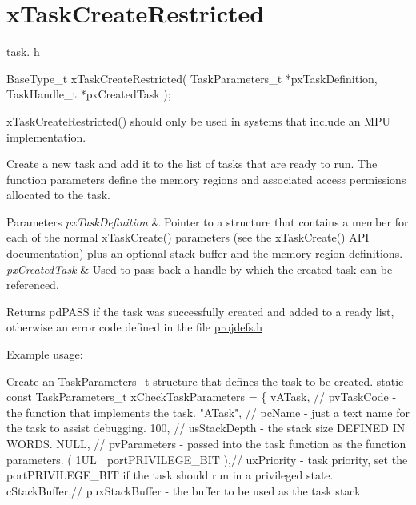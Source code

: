 \hypertarget{group__xTaskCreateRestricted}{\section{x\-Task\-Create\-Restricted}
\label{group__xTaskCreateRestricted}
}
task. h 
\begin{DoxyPre}
 BaseType\_t xTaskCreateRestricted( TaskParameters\_t *pxTaskDefinition, TaskHandle\_t *pxCreatedTask );\end{DoxyPre}


x\-Task\-Create\-Restricted() should only be used in systems that include an M\-P\-U implementation.

Create a new task and add it to the list of tasks that are ready to run. The function parameters define the memory regions and associated access permissions allocated to the task.


\begin{DoxyParams}{Parameters}
{\em px\-Task\-Definition} & Pointer to a structure that contains a member for each of the normal x\-Task\-Create() parameters (see the x\-Task\-Create() A\-P\-I documentation) plus an optional stack buffer and the memory region definitions.\\
\hline
{\em px\-Created\-Task} & Used to pass back a handle by which the created task can be referenced.\\
\hline
\end{DoxyParams}
\begin{DoxyReturn}{Returns}
pd\-P\-A\-S\-S if the task was successfully created and added to a ready list, otherwise an error code defined in the file \hyperlink{projdefs_8h}{projdefs.\-h}
\end{DoxyReturn}
Example usage\-: 
\begin{DoxyPre}
Create an TaskParameters\_t structure that defines the task to be created.
static const TaskParameters\_t xCheckTaskParameters =
\{
    vATask,     // pvTaskCode - the function that implements the task.
    "ATask",    // pcName - just a text name for the task to assist debugging.
    100,        // usStackDepth - the stack size DEFINED IN WORDS.
    NULL,       // pvParameters - passed into the task function as the function parameters.
    ( 1UL | portPRIVILEGE\_BIT ),// uxPriority - task priority, set the portPRIVILEGE\_BIT if the task should run in a privileged state.
    cStackBuffer,// puxStackBuffer - the buffer to be used as the task stack.\end{DoxyPre}



